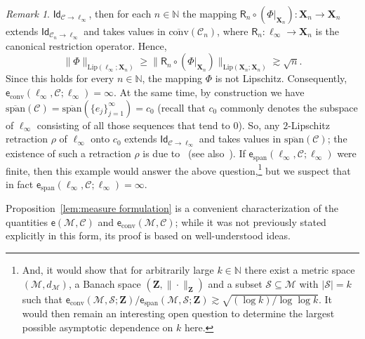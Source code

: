 \documentclass[11pt,reqno]{amsart}
\renewcommand{\ge}{\geqslant}
\newcommand{\X}{\mathbf X}
\theoremstyle{remark}
\newtheorem{remark}[theorem]{Remark}
\newcommand{\MM}{\mathcal{M}}
\renewcommand{\subset}{\subseteq}
\newcommand{\N}{\mathbb N}
\newcommand{\Lip}{\mathrm{Lip}}
\newcommand{\ee}{\mathsf{e}}
\newcommand{\bfZ}{\mathbf{Z}}
\newcommand{\sub}{\mathscr{C}}
\renewcommand{\1}{\mathbf 1}
\newcommand{\conv}{\mathrm{conv}}
\newcommand{\spn}{\mathrm{ span}}
\begin{document}
\begin{remark}
$\mathsf{Id}_{\sub\to \ell_\infty}$, then for each $n\in \N$ the mapping $\mathsf{R}_n\circ (\Phi|_{\X_n}):\X_n\to \X_n$ extends  $\mathsf{Id}_{\sub_n\to \ell_\infty}$ and takes values in $\overline{\conv}(\sub_n)$, where $\mathsf{R}_n:\ell_\infty\to \X_n$ is the canonical restriction operator. Hence, $$\| \Phi\|_{\Lip(\ell_\infty;\X_n)}\ge \|\mathsf{R}_n\circ (\Phi|_{\X_n})\|_{\Lip(\X_n;\X_n)}\gtrsim \sqrt{n}.$$ Since this holds for every $n\in \N$, the mapping $\Phi$ is not Lipschitz. Consequently,   $\ee_\conv(\ell_\infty,\sub;\ell_\infty)=\infty$. At the same time, by construction we have $\overline{\spn}(\sub)=\overline{\spn}(\{e_j\}_{j=1}^\infty)= c_0$  (recall that $c_0$ commonly denotes the subspace of $\ell_\infty$ consisting of all those sequences that tend to $0$). So, any $2$-Lipschitz retraction $\rho$ of $\ell_\infty$ onto $c_0$ extends $\mathsf{Id}_{\sub\to \ell_\infty}$ and takes values in $\overline{\spn}(\sub)$; the existence of such a retraction $\rho$ is due to~\cite{Lin64} (see also~\cite[Example~1.5]{BL00}). If $\ee_\spn(\ell_\infty,\sub;\ell_\infty)$ were finite, then this example would answer the above question,\footnote{And, it would show that for arbitrarily large $k\in \N$  there exist a metric space $(\MM,d_\MM)$, a Banach space $(\bfZ,\|\cdot\|_\bfZ)$ and a  subset $\mathcal{S}\subset \MM$ with $|\mathcal{S}|=k$ such that $\ee_\conv(\MM,\mathcal{S};\bfZ)/\ee_\spn(\MM,\mathcal{S};\bfZ)\gtrsim \sqrt{(\log k)/\log\log k}$. It would then remain an interesting open question to determine the largest possible asymptotic dependence on $k$ here.} but we suspect that in fact $\ee_\spn(\ell_\infty,\sub;\ell_\infty)=\infty$.
\end{remark}



Proposition~\ref{lem:measure formulation} is a convenient characterization of the quantities $\ee(\MM,\sub)$ and $\ee_\conv(\MM,\sub)$; while it was not previously stated explicitly in this form, its proof is based on well-understood ideas.
\end{document}
